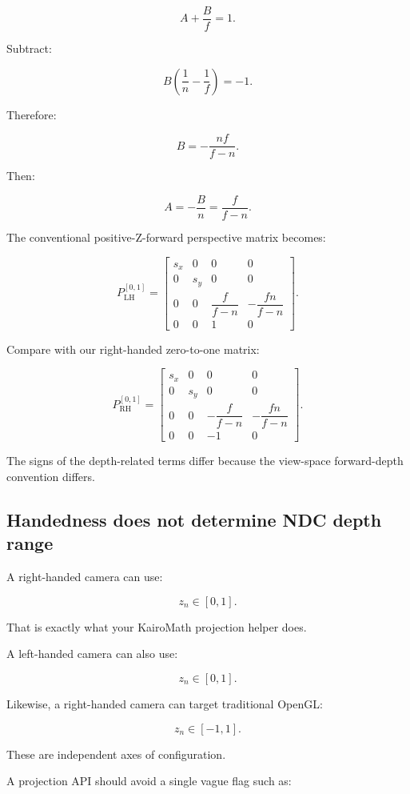 \[
 A+\frac Bf=1.
\]

Subtract:

\[
 B\left(\frac1n-\frac1f\right)=-1.
\]

Therefore:

\[
 \boxed{ B=-\frac{nf}{f-n} }.
\]

Then:

\[
 A=-\frac Bn=\frac f{f-n}.
\]

The conventional positive-Z-forward perspective matrix becomes:

\[
 \boxed{ P_{\mathrm{LH}}^{[0,1]}= \begin{bmatrix} s_x&0&0&0\\ 0&s_y&0&0\\ 0&0&\dfrac f{f-n}&-\dfrac{fn}{f-n}\\ 0&0&1&0 \end{bmatrix} }.
\]

Compare with our right-handed zero-to-one matrix:

\[
 P_{\mathrm{RH}}^{[0,1]}= \begin{bmatrix} s_x&0&0&0\\ 0&s_y&0&0\\ 0&0&-\dfrac f{f-n}&-\dfrac{fn}{f-n}\\ 0&0&-1&0 \end{bmatrix}.
\]

The signs of the depth-related terms differ because the view-space forward-depth convention differs.

\subsection{Handedness does not determine NDC depth range}\label{02-foundations-ii-ch033-handedness-does-not-determine-ndc-depth-range}

A right-handed camera can use:

\[
 z_n\in[0,1].
\]

That is exactly what your KairoMath projection helper does.

A left-handed camera can also use:

\[
 z_n\in[0,1].
\]

Likewise, a right-handed camera can target traditional OpenGL:

\[
 z_n\in[-1,1].
\]

These are independent axes of configuration.

A projection API should avoid a single vague flag such as:

